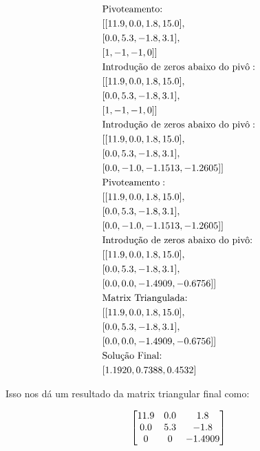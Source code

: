 \documentclass[twoside]{amsart}
\numberwithin{equation}{section}
\begin{document}
\begin{align}
    &\textnormal{Pivoteamento:}\nonumber\\
    &[[11.9, 0.0, 1.8, 15.0],\nonumber\\ &[0.0, 5.3, -1.8, 3.1],\nonumber\\ &[1, -1, -1, 0]]\nonumber\\
    &\textnormal{Introdução de zeros abaixo do pivô}:\nonumber\\
    &[[11.9, 0.0, 1.8, 15.0],\nonumber\\ & [0.0, 5.3, -1.8, 3.1],\nonumber\\ & [1, -1, -1, 0]]\nonumber\\
    &\textnormal{Introdução de zeros abaixo do pivô}:\nonumber\\
    &[[11.9, 0.0, 1.8, 15.0],\nonumber\\ & [0.0, 5.3, -1.8, 3.1],\nonumber\\ & [0.0, -1.0, -1.1513, -1.2605]]\nonumber\\
    &\textnormal{Pivoteamento}:\nonumber\\
    &[[11.9, 0.0, 1.8, 15.0],\nonumber\\ & [0.0, 5.3, -1.8, 3.1],\nonumber\\ & [0.0, -1.0, -1.1513, -1.2605]]\nonumber\\
    &\textnormal{Introdução de zeros abaixo do pivô:}\nonumber\\
    &[[11.9, 0.0, 1.8, 15.0],\nonumber\\ & [0.0, 5.3, -1.8, 3.1],\nonumber\\ & [0.0, 0.0, -1.4909, -0.6756]]\nonumber\\
    &\textnormal{Matrix Triangulada:}\nonumber\\
    &[[11.9, 0.0, 1.8, 15.0],\nonumber\\ & [0.0, 5.3, -1.8, 3.1],\nonumber\\ & [0.0, 0.0, -1.4909, -0.6756]]\nonumber\\
    &\textnormal{Solução Final:}\nonumber\\
    &[1.1920, 0.7388, 0.4532]\nonumber
\end{align}

Isso nos dá um resultado da matrix triangular final como:

\begin{align}
    \mqty[ 11.9 & 0.0 & 1.8 \\ 0.0 & 5.3 & -1.8\\0 & 0 & -1.4909]
\end{align}
\end{document}
